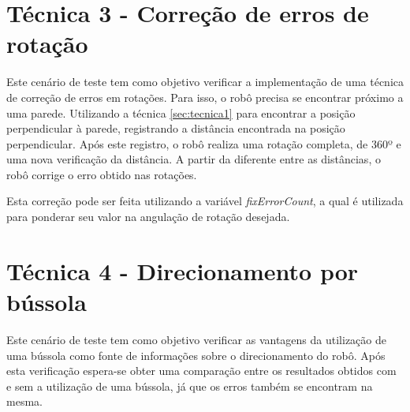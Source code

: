 \section{Técnica 3 - Correção de erros de rotação} %
\label{sec:técnica_3_correção_de_erros_de_rotação}
	
	Este cenário de teste tem como objetivo verificar a implementação de uma técnica de correção de erros em rotações. Para isso, o robô precisa se encontrar próximo a uma parede. Utilizando a técnica \ref{sec:tecnica1} para encontrar a posição perpendicular à parede, registrando a distância encontrada na posição perpendicular. Após este registro, o robô realiza uma rotação completa, de 360º e uma nova verificação da distância. A partir da diferente entre as distâncias, o robô corrige o erro obtido nas rotações. 

	Esta correção pode ser feita utilizando a variável \textit{fixErrorCount}, a qual é utilizada para ponderar seu valor na angulação de rotação desejada.

\section{Técnica 4 - Direcionamento por bússola} %
\label{sec:técnica_4_direcionamento_por_bússola}
	
	Este cenário de teste tem como objetivo verificar as vantagens da utilização de uma bússola como fonte de informações sobre o direcionamento do robô. Após esta verificação espera-se obter uma comparação entre os resultados obtidos com e sem a utilização de uma bússola, já que os erros também se encontram na mesma.
